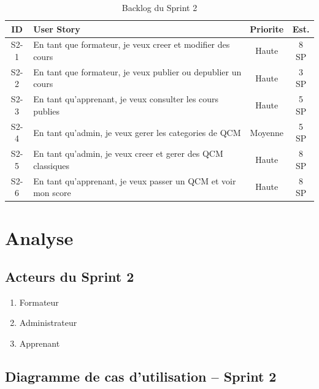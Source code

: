 \documentclass[a4paper,12pt]{report}
\begin{document}
\begin{table}[H]
  \centering
  \caption{Backlog du Sprint 2}
  \label{tab:backlog_s2}
  \begin{tabular}{|c|p{7.5cm}|c|c|}
    \hline
    \textbf{ID} & \textbf{User Story} & \textbf{Priorite} & \textbf{Est.} \\
    \hline
    S2-1 & En tant que formateur, je veux creer et modifier des cours & Haute & 8 SP \\
    \hline
    S2-2 & En tant que formateur, je veux publier ou depublier un cours & Haute & 3 SP \\
    \hline
    S2-3 & En tant qu'apprenant, je veux consulter les cours publies & Haute & 5 SP \\
    \hline
    S2-4 & En tant qu'admin, je veux gerer les categories de QCM & Moyenne & 5 SP \\
    \hline
    S2-5 & En tant qu'admin, je veux creer et gerer des QCM classiques & Haute & 8 SP \\
    \hline
    S2-6 & En tant qu'apprenant, je veux passer un QCM et voir mon score & Haute & 8 SP \\
    \hline
  \end{tabular}
\end{table}

\section{Analyse}

\subsection{Acteurs du Sprint 2}
\begin{enumerate}
  \item Formateur
  \item Administrateur
  \item Apprenant
\end{enumerate}

\subsection{Diagramme de cas d'utilisation -- Sprint 2}
\end{document}
